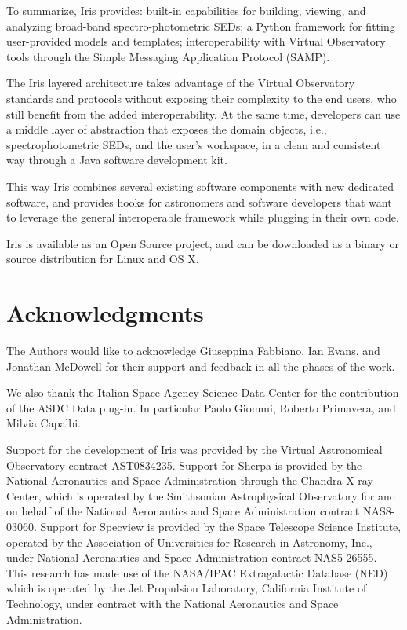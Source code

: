 \documentclass[preprint,authoryear,5p]{elsarticle}
\begin{document}
To summarize, Iris provides: built-in capabilities for building, viewing, and
analyzing broad-band spec\-tro-pho\-to\-met\-ric SEDs; a Python framework for fitting
user-pro\-vid\-ed models and templates; interoperability with Virtual Observatory
tools through the Simple Messaging Application Protocol (SAMP).

The Iris layered architecture takes advantage of the Virtual Observatory
standards and protocols without exposing their complexity to the end users,
who still benefit from the added interoperability. At the same time, developers
can use a middle layer of abstraction that exposes the domain objects, i.e.,
spectrophotometric SEDs, and the user's workspace, in a clean and consistent
way through a Java software development kit.

\begin{sloppypar}
This way Iris combines several existing software components with new dedicated
software, and provides hooks for astronomers and software developers that want to
leverage the general interoperable framework while plugging in their own code.
\end{sloppypar}

Iris is available as an Open Source project, and can be downloaded as a binary
or source distribution for Linux and OS X.


\section*{Acknowledgments}
The Authors would like to acknowledge Giuseppina Fabbiano, Ian Evans,
and Jonathan McDowell
for their support and feedback in all the phases of the work.

We also thank the Italian Space Agency Science Data Center for the contribution
of the ASDC Data plug-in. In particular Paolo Giommi, Roberto Primavera, and
Milvia Capalbi.

Support for the development of Iris was provided by
the Virtual Astronomical Observatory contract AST0834235. Support for Sherpa is
provided by the National Aeronautics and Space Administration through the
Chandra X-ray Center, which is operated by the Smithsonian Astrophysical
Observatory for and on behalf of the National Aeronautics and Space
Administration contract NAS8-03060.  Support for Specview is provided by the
Space Telescope Science Institute, operated by the Association of Universities
for Research in Astronomy, Inc., under National Aeronautics and Space
Administration contract NAS5-26555. This research has made use of the NASA/IPAC
Extragalactic Database (NED) which is operated by the Jet Propulsion Laboratory,
California Institute of Technology, under contract with the National Aeronautics
and Space Administration.
\end{document}
